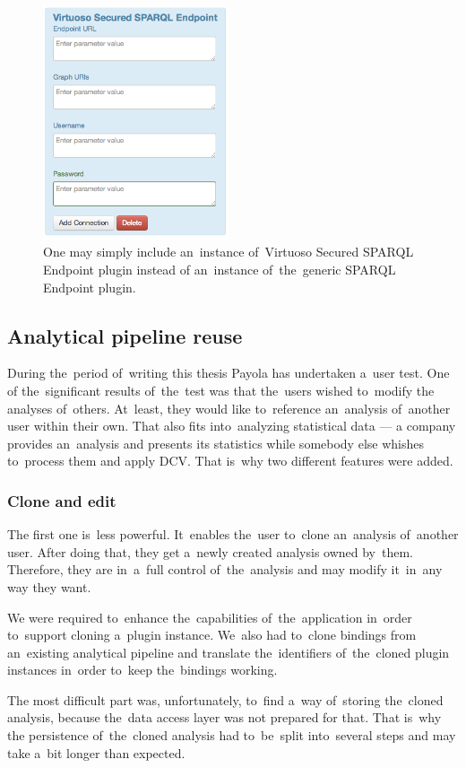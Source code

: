 \begin{figure}
	\centering
	\includegraphics[width=55mm]{img/secured.png}
	\caption{One may simply include an~instance of~Virtuoso Secured SPARQL Endpoint plugin instead
	of an~instance of~the~generic SPARQL Endpoint plugin.}
	\label{fig:secured-ds}
\end{figure}

\subsection{Analytical pipeline reuse}
During the~period of~writing this thesis Payola has undertaken a~user test. One 
of the~significant results of~the~test was that the~users wished to~modify the
analyses of~others. At~least, they would like to~reference an~analysis of~another user within their own. That also fits into~analyzing statistical data --- 
a company provides an~analysis and presents its statistics while somebody else 
whishes to~process them and apply DCV. That is~why two different features 
were added.

\subsubsection{Clone and edit}
The first one is~less powerful. It~enables the~user to~clone an~analysis of~another user. After doing that, they get a~newly created analysis owned by~them. Therefore, they are in~a~full control of~the~analysis and may modify it~in~any way they want.

We were required to~enhance the~capabilities of~the~application in~order to~support cloning a~plugin instance. We~also had to~clone bindings from an~existing analytical pipeline and translate the~identifiers of~the~cloned plugin 
instances in~order to~keep the~bindings working.

The most difficult part was, unfortunately, to~find a~way of~storing the~cloned 
analysis, because the~data access layer was not prepared for that. That is~why
the persistence of~the~cloned analysis had to~be~split into~several steps and may take a~bit longer than expected.

